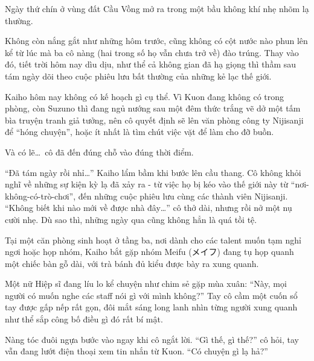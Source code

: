 \documentclass[../main.tex]{subfiles}
\begin{document}

Ngày thứ chín ở vùng đất Cầu Vồng mở ra trong một bầu không khí nhẹ nhõm lạ thường.

Không còn nắng gắt như những hôm trước, cũng không có cột nước nào phun lên kể từ lúc mà ba cô nàng (hai trong số họ vẫn chưa trở về) đào trúng. Thay vào đó, tiết trời hôm nay dìu dịu, như thể cả không gian đã hạ giọng thì thầm sau tám ngày dõi theo cuộc phiêu lưu bất thường của những kẻ lạc thế giới.

Kaiho hôm nay không có kế hoạch gì cụ thể. Vì Kuon đang không có trong phòng, còn Suzuno thì đang ngủ nướng sau một đêm thức trắng vẽ dở một tấm bìa truyện tranh giả tưởng, nên cô quyết định sẽ lên văn phòng công ty Nijisanji để ``hóng chuyện'', hoặc ít nhất là tìm chút việc vặt để làm cho đỡ buồn.

Và có lẽ\dots\ cô đã đến đúng chỗ vào đúng thời điểm.

\ct

``Đã tám ngày rồi nhỉ\dots'' Kaiho lẩm bầm khi bước lên cầu thang. Cô không khỏi nghĩ về những sự kiện kỳ lạ đã xảy ra - từ việc họ bị kéo vào thế giới này từ ``nơi-không-có-trò-chơi'', đến những cuộc phiêu lưu cùng các thành viên Nijisanji. ``Không biết khi nào mới về được nhà đây\dots'' cô thở dài, nhưng rồi nở một nụ cười nhẹ. Dù sao thì, những ngày qua cũng không hẳn là quá tồi tệ.

Tại một căn phòng sinh hoạt ở tầng ba, nơi dành cho các talent muốn tạm nghỉ ngơi hoặc họp nhóm, Kaiho bắt gặp nhóm Meifu (メイフ) đang tụ họp quanh một chiếc bàn gỗ dài, với trà bánh đủ kiểu được bày ra xung quanh.

Một nữ Hiệp sĩ đang líu lo kể chuyện như chim sẻ gặp mùa xuân: ``Này, mọi người có muốn nghe các staff nói gì với mình không?'' Tay cô cầm một cuốn sổ tay được gấp nếp rất gọn, đôi mắt sáng long lanh nhìn từng người xung quanh như thể sắp công bố điều gì đó rất bí mật.

Nàng tóc đuôi ngựa bước vào ngay khi cô ngắt lời. ``Gì thế, gì thế?'' cô hỏi, tay vẫn đang lướt điện thoại xem tin nhắn từ Kuon. ``Có chuyện gì lạ hả?''
\end{document}
